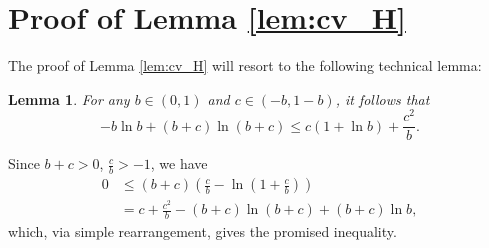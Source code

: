 \documentclass[onecolumn,letterpaper]{IEEEtran}
\newtheorem{lemma}{Lemma}
\newcommand{\vara}{{b}}
\newcommand{\varb}{{c}}
\begin{document}
\section{Proof of Lemma \ref{lem:cv_H}}
\label{app:lem_cv}
The proof of Lemma \ref{lem:cv_H} will resort to the following technical lemma:
\begin{lemma} \label{lem:cv:series}
For any $ \vara \in (0,1)$ and $\varb \in (-\vara,1-\vara)$, it follows that 
\begin{equation*}
    -\vara \ln\vara + (\vara+\varb)\ln(\vara+\varb) \le \varb (1+ \ln \vara ) + \frac{\varb^2}{\vara}.
\end{equation*}
\end{lemma}
\begin{IEEEproof}
Since $\vara + \varb > 0$, $\frac{\varb}{\vara} > -1$, we have 
\begin{align*}
    0 &\le (\vara+\varb) \left( \frac{\varb}{\vara} - \ln\left( 1 + \frac{\varb}{\vara} \right) \right) \\ 
    &= \varb + \frac{\varb^2}{\vara} - (\vara+\varb)\ln(\vara+\varb) + (\vara+\varb)\ln\vara,
\end{align*}
which, via simple rearrangement, gives the promised inequality.
\end{IEEEproof}
\end{document}
